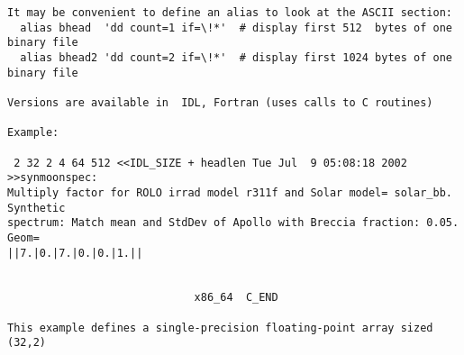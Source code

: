 \begin{verbatim}
It may be convenient to define an alias to look at the ASCII section:
  alias bhead  'dd count=1 if=\!*'  # display first 512  bytes of one binary file
  alias bhead2 'dd count=2 if=\!*'  # display first 1024 bytes of one binary file

Versions are available in  IDL, Fortran (uses calls to C routines)

Example: 

 2 32 2 4 64 512 <<IDL_SIZE + headlen Tue Jul  9 05:08:18 2002 >>synmoonspec: 
Multiply factor for ROLO irrad model r311f and Solar model= solar_bb. Synthetic 
spectrum: Match mean and StdDev of Apollo with Breccia fraction: 0.05. Geom=
||7.|0.|7.|0.|0.|1.||                                                          
                                                                               
                                                                               
                             x86_64  C_END
 
This example defines a single-precision floating-point array sized (32,2)

\end{verbatim}